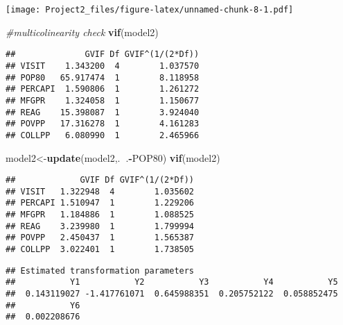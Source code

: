 \documentclass[]{article}
\newenvironment{Shaded}{\begin{snugshade}}{\end{snugshade}}
\newcommand{\KeywordTok}[1]{\textcolor[rgb]{0.13,0.29,0.53}{\textbf{#1}}}
\newcommand{\DecValTok}[1]{\textcolor[rgb]{0.00,0.00,0.81}{#1}}
\newcommand{\CommentTok}[1]{\textcolor[rgb]{0.56,0.35,0.01}{\textit{#1}}}
\newcommand{\OperatorTok}[1]{\textcolor[rgb]{0.81,0.36,0.00}{\textbf{#1}}}
\newcommand{\NormalTok}[1]{#1}
\begin{document}
\texttt{[image: Project2\_files/figure-latex/unnamed-chunk-8-1.pdf]}

\begin{Shaded}
\begin{Highlighting}[]
\CommentTok{#multicolinearity check}
\KeywordTok{vif}\NormalTok{(model2)}
\end{Highlighting}
\end{Shaded}

\begin{verbatim}
##              GVIF Df GVIF^(1/(2*Df))
## VISIT    1.343200  4        1.037570
## POP80   65.917474  1        8.118958
## PERCAPI  1.590806  1        1.261272
## MFGPR    1.324058  1        1.150677
## REAG    15.398087  1        3.924040
## POVPP   17.316278  1        4.161283
## COLLPP   6.080990  1        2.465966
\end{verbatim}

\begin{Shaded}
\begin{Highlighting}[]
\NormalTok{model2<-}\KeywordTok{update}\NormalTok{(model2,.}\OperatorTok{~}\NormalTok{.}\OperatorTok{-}\NormalTok{POP80)}
\KeywordTok{vif}\NormalTok{(model2)}
\end{Highlighting}
\end{Shaded}

\begin{verbatim}
##             GVIF Df GVIF^(1/(2*Df))
## VISIT   1.322948  4        1.035602
## PERCAPI 1.510947  1        1.229206
## MFGPR   1.184886  1        1.088525
## REAG    3.239980  1        1.799994
## POVPP   2.450437  1        1.565387
## COLLPP  3.022401  1        1.738505
\end{verbatim}

\begin{Shaded}
\end{Shaded}

\begin{verbatim}
## Estimated transformation parameters 
##           Y1           Y2           Y3           Y4           Y5 
##  0.143119027 -1.417761071  0.645988351  0.205752122  0.058852475 
##           Y6 
##  0.002208676
\end{verbatim}
\end{document}
